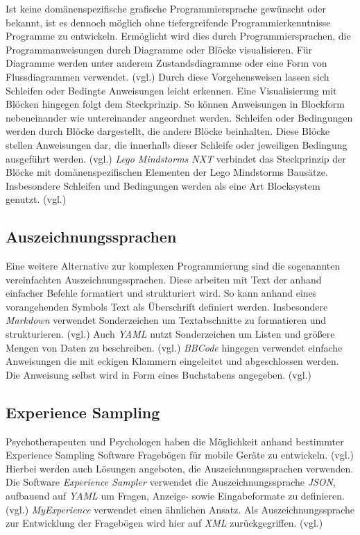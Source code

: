 Ist keine domänenspezifische grafische Programmiersprache gewünscht oder bekannt, ist es dennoch möglich ohne tiefergreifende Programmierkenntnisse Programme zu entwickeln. Ermöglicht wird dies durch Programmiersprachen, die Programmanweisungen durch Diagramme oder Blöcke visualisieren. Für Diagramme werden unter anderem Zustandsdiagramme oder eine Form von Flussdiagrammen verwendet. (vgl.\cite{SwissEdu45:online}\cite{DRAKONEd12:online}\cite{PureData15:online}) Durch diese Vorgehensweisen lassen sich Schleifen oder Bedingte Anweisungen leicht erkennen. Eine Visualisierung mit Blöcken hingegen folgt dem Steckprinzip. So können Anweisungen in Blockform nebeneinander wie untereinander angeordnet werden. Schleifen oder Bedingungen werden durch Blöcke dargestellt, die andere Blöcke beinhalten. Diese Blöcke stellen Anweisungen dar, die innerhalb dieser Schleife oder jeweiligen Bedingung ausgeführt werden. (vgl.\cite{BlocklyG18:online}\cite{NXTSoftw71:online}\cite{SnapBuil34:online}\cite{squeakla50:online}) \emph{Lego Mindstorms NXT} verbindet das Steckprinzip der Blöcke mit domänenspezifischen Elementen der Lego Mindstorms Bausätze. Insbesondere Schleifen und Bedingungen werden als eine Art Blocksystem genutzt. (vgl.\cite{NXTSoftw71:online})


\subsection{Auszeichnungssprachen}
Eine weitere Alternative zur komplexen Programmierung sind die sogenannten vereinfachten Auszeichnungssprachen. Diese arbeiten mit Text der anhand einfacher Befehle formatiert und strukturiert wird. So kann anhand eines vorangehenden Symbols Text als Überschrift definiert werden. Insbesondere \emph{Markdown} verwendet Sonderzeichen um Textabschnitte zu formatieren und strukturieren. (vgl.\cite{GettingS56:online}) Auch \emph{YAML} nutzt Sonderzeichen um Listen und größere Mengen von Daten zu beschreiben. (vgl.\cite{TheOffic64:online}) \emph{BBCode} hingegen verwendet einfache Anweisungen die mit eckigen Klammern eingeleitet und abgeschlossen werden. Die Anweisung selbst wird in Form eines Buchstabens angegeben. (vgl.\cite{BBCodeor24:online})


\subsection{Experience Sampling}
Psychotherapeuten und Psychologen haben die Möglichkeit anhand bestimmter Experience Sampling Software Fragebögen für mobile Geräte zu entwickeln. (vgl.\cite{OSFSabri6:online}) Hierbei werden auch Lösungen angeboten, die  Auszeichnungssprachen verwenden. Die Software \emph{Experience Sampler} verwendet die Auszeichnungssprache \emph{JSON}, aufbauend auf \emph{YAML} um Fragen, Anzeige- sowie Eingabeformate zu definieren. (vgl.\cite{OSFSabri6:online}) \emph{MyExperience} verwendet einen ähnlichen Ansatz. Als Auszeichnungssprache zur Entwicklung der Fragebögen wird hier auf \emph{XML} zurückgegriffen. (vgl.\cite{theMyExp48:online})

